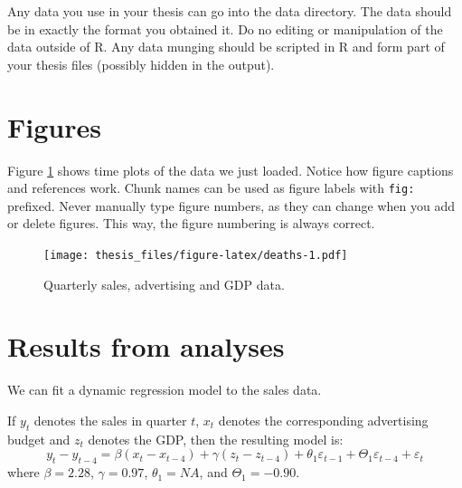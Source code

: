\documentclass{aucklandthesis}
\begin{document}
\begin{Shaded}
\begin{Highlighting}[]
\StringTok{ }\NormalTok{(}\NormalTok{(}\NormalTok{)[, }\NormalTok{], } \NormalTok{, } \NormalTok{)}
\end{Highlighting}
\end{Shaded}

Any data you use in your thesis can go into the data directory. The data should be in exactly the format you obtained it. Do no editing or manipulation of the data outside of R. Any data munging should be scripted in R and form part of your thesis files (possibly hidden in the output).

\hypertarget{figures}{%
\section{Figures}\label{figures}}

Figure \ref{fig:deaths} shows time plots of the data we just loaded. Notice how figure captions and references work. Chunk names can be used as figure labels with \texttt{fig:} prefixed. Never manually type figure numbers, as they can change when you add or delete figures. This way, the figure numbering is always correct.

\begin{figure}
\centering
\texttt{[image: thesis\_files/figure-latex/deaths-1.pdf]}
\caption{\label{fig:deaths}Quarterly sales, advertising and GDP data.}
\end{figure}

\hypertarget{results-from-analyses}{%
\section{Results from analyses}\label{results-from-analyses}}

We can fit a dynamic regression model to the sales data.

If \(y_t\) denotes the sales in quarter \(t\), \(x_t\) denotes the corresponding advertising budget and \(z_t\) denotes the GDP, then the resulting model is:
\begin{equation}
  y_t - y_{t-4} = \beta (x_t-x_{t-4}) + \gamma (z_t-z_{t-4}) + \theta_1 \varepsilon_{t-1} + \Theta_1 \varepsilon_{t-4} + \varepsilon_t
\end{equation}
where
\(\beta = 2.28\),
\(\gamma = 0.97\),
\(\theta_1 = NA\),
and
\(\Theta_1 = -0.90\).
\end{document}
